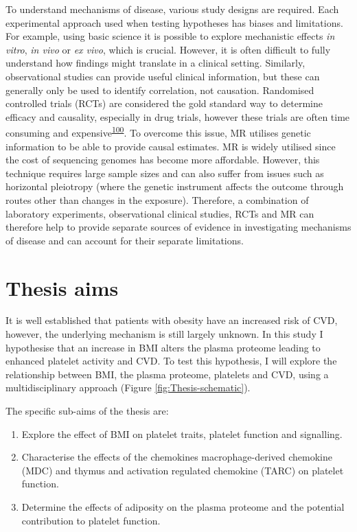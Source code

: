 \documentclass[11pt,twoside]{bristolthesis}
\providecommand{\tightlist}{%
  \setlength{\itemsep}{0pt}\setlength{\parskip}{0pt}}
\begin{document}
To understand mechanisms of disease, various study designs are required. Each experimental approach used when testing hypotheses has biases and limitations. For example, using basic science it is possible to explore mechanistic effects \emph{in vitro}, \emph{in vivo} or \emph{ex vivo}, which is crucial. However, it is often difficult to fully understand how findings might translate in a clinical setting. Similarly, observational studies can provide useful clinical information, but these can generally only be used to identify correlation, not causation. Randomised controlled trials (RCTs) are considered the gold standard way to determine efficacy and causality, especially in drug trials, however these trials are often time consuming and expensive\textsuperscript{\protect\hyperlink{ref-Bennett2017}{100}}. To overcome this issue, MR utilises genetic information to be able to provide causal estimates. MR is widely utilised since the cost of sequencing genomes has become more affordable. However, this technique requires large sample sizes and can also suffer from issues such as horizontal pleiotropy (where the genetic instrument affects the outcome through routes other than changes in the exposure). Therefore, a combination of laboratory experiments, observational clinical studies, RCTs and MR can therefore help to provide separate sources of evidence in investigating mechanisms of disease and can account for their separate limitations.

\hypertarget{thesis-aims}{%
\section{Thesis aims}\label{thesis-aims}}

It is well established that patients with obesity have an increased risk of CVD, however, the underlying mechanism is still largely unknown. In this study I hypothesise that an increase in BMI alters the plasma proteome leading to enhanced platelet activity and CVD. To test this hypothesis, I will explore the relationship between BMI, the plasma proteome, platelets and CVD, using a multidisciplinary approach (Figure \ref{fig:Thesis-schematic}).

The specific sub-aims of the thesis are:
\begin{enumerate}
\def\labelenumi{\arabic{enumi})}
\tightlist
\item
  Explore the effect of BMI on platelet traits, platelet function and signalling.
\item
  Characterise the effects of the chemokines macrophage-derived chemokine (MDC) and thymus and activation regulated chemokine (TARC) on platelet function.
\item
  Determine the effects of adiposity on the plasma proteome and the potential contribution to platelet function.
\end{enumerate}
\end{document}
